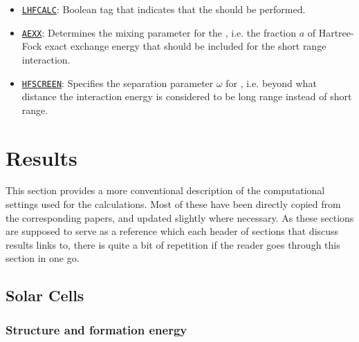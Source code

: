 \begin{refsection}
\begin{itemize}
 \label{appendix:sec-LHFCALC} 
\item \href{https://cms.mpi.univie.ac.at/wiki/index.php/LHFCALC}{\texttt{LHFCALC}}: 
Boolean tag that indicates that the  should be performed. 

 \label{appendix:sec-AEXX} 
\item \href{https://cms.mpi.univie.ac.at/wiki/index.php/AEXX}{\texttt{AEXX}}: 
Determines the mixing parameter for the , 
i.e. the fraction $a$ of Hartree-Fock exact exchange energy that should be 
included for the short range interaction.

 \label{appendix:sec-HFSCREEN} 
\item \href{https://cms.mpi.univie.ac.at/wiki/index.php/HFSCREEN}{\texttt{HFSCREEN}}: 
Specifies the separation parameter $\omega$ for 
, i.e. beyond what distance the 
interaction energy is considered to be long range instead of short range.

\end{itemize} 

\pagebreak[4]
\section{Results} \label{appendix:sec-results} 

This section provides a more conventional description of the computational 
settings used for the calculations. Most of these have been directly copied 
from the corresponding papers, and updated slightly where necessary. As these 
sections are supposed to serve as a reference which each header of sections 
that discuss results links to, there is quite a bit of repetition if the reader 
goes through this section in one go.

\subsection{Solar Cells} \label{appendix:sec-solar} 

\subsubsection{Structure and formation energy} \label{appendix:sec-solar_structure} 



\end{refsection}
